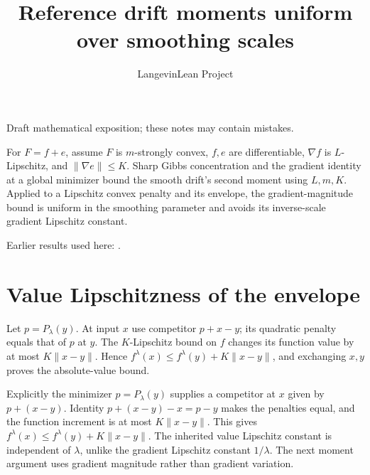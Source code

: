 \documentclass[11pt,a4paper]{article}
\title{\texorpdfstring{Reference drift moments uniform over smoothing scales}{Reference drift moments uniform over smoothing scales}}
\author{LangevinLean Project}
\date{}
\begin{document}
\maketitle
Draft mathematical exposition; these notes may contain mistakes.


For \(F=f+e\), assume \(F\) is \(m\)-strongly convex, \(f,e\) are differentiable, \(\nabla f\) is \(L\)-Lipschitz, and \(\|\nabla e\|\le K\). Sharp Gibbs concentration and the gradient identity at a global minimizer bound the smooth drift’s second moment using \(L,m,K\). Applied to a Lipschitz convex penalty and its envelope, the gradient-magnitude bound is uniform in the smoothing parameter and avoids its inverse-scale gradient Lipschitz constant.



Earlier results used here: \cite[Section~3.28]{LangevinLean2026ULASC}.

\section{\texorpdfstring{Value Lipschitzness of the envelope}{Value Lipschitzness of the envelope}}


Let \(p=P_\lambda(y)\). At input \(x\) use competitor \(p+x-y\); its quadratic penalty equals that of \(p\) at \(y\). The \(K\)-Lipschitz bound on \(f\) changes its function value by at most \(K\|x-y\|\). Hence \(f^\lambda(x)\le f^\lambda(y)+K\|x-y\|\), and exchanging \(x,y\) proves the absolute-value bound.



Explicitly the minimizer \(p=P_\lambda(y)\) supplies a competitor at \(x\) given by \(p+(x-y)\). Identity \(p+(x-y)-x=p-y\) makes the penalties equal, and the function increment is at most \(K\|x-y\|\). This gives \(f^\lambda(x)\le f^\lambda(y)+K\|x-y\|\). The inherited value Lipschitz constant is independent of \(\lambda\), unlike the gradient Lipschitz constant \(1/\lambda\). The next moment argument uses gradient magnitude rather than gradient variation.
\end{document}
